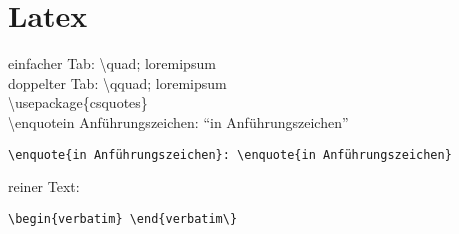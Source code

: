 \chapter{Latex}
einfacher Tab: \textbackslash quad; lorem\quad ipsum\\
doppelter Tab: \textbackslash qquad; lorem\qquad ipsum\\

\textbackslash usepackage\{csquotes\}\\
\textbackslash enquote{in Anführungszeichen}: \enquote{in Anführungszeichen}
\begin{verbatim}
\enquote{in Anführungszeichen}: \enquote{in Anführungszeichen}
\end{verbatim}
reiner Text:
\begin{verbatim}
\begin{verbatim} \end{verbatim\}
\end{verbatim}
